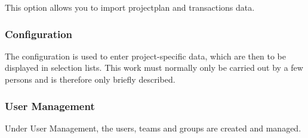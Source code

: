 This option allows you to import projectplan and transactions data.

\subsubsection{Configuration}

The configuration is used to enter project-specific data, which are then to be displayed in selection lists. This work must normally only be carried out by a few persons and is therefore only briefly described.

\subsubsection{User Management}

Under User Management, the users, teams and groups are created and managed.
